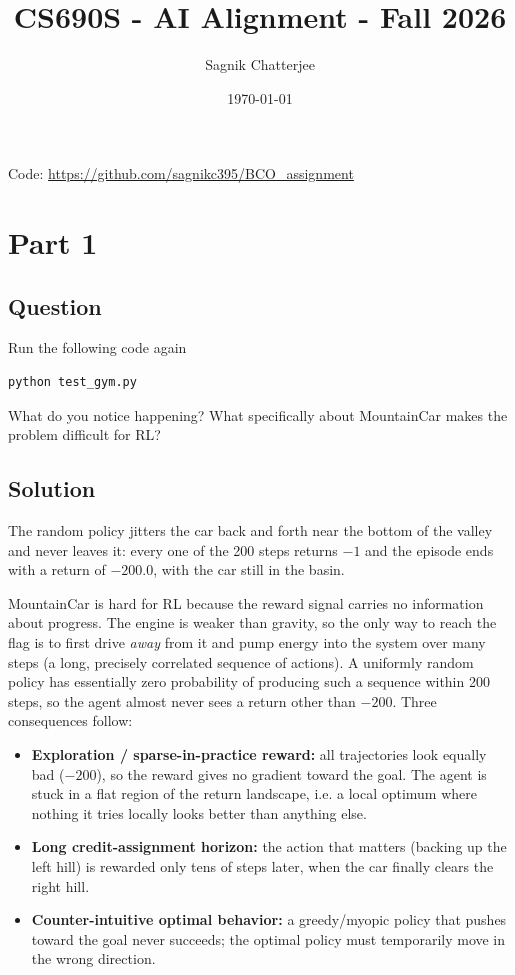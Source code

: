 \documentclass[12pt]{article}%
\begin{document}
\title{CS690S - AI Alignment - Fall 2026}
\author{Sagnik Chatterjee}
\date{\today}
\maketitle

\begin{center}
Code: \url{https://github.com/sagnikc395/BCO_assignment}
\end{center}


\section{Part 1}

\subsection{Question}
Run the following code again
\begin{verbatim}
python test_gym.py
\end{verbatim}
What do you notice happening? What specifically about MountainCar makes the
problem difficult for RL?

\subsection{Solution}
The random policy jitters the car back and forth near the bottom of the valley and never
leaves it: every one of the 200 steps returns $-1$ and the episode ends with a return of
$-200.0$, with the car still in the basin.

MountainCar is hard for RL because the reward signal carries no information about
progress. The engine is weaker than gravity, so the only way to reach the flag is to
first drive \emph{away} from it and pump energy into the system over many steps
(a long, precisely correlated sequence of actions). A uniformly random policy has
essentially zero probability of producing such a sequence within 200 steps, so the
agent almost never sees a return other than $-200$. Three consequences follow:
\begin{itemize}
  \item \textbf{Exploration / sparse-in-practice reward:} all trajectories look equally
        bad ($-200$), so the reward gives no gradient toward the goal. The agent is
        stuck in a flat region of the return landscape, i.e. a local optimum where
        nothing it tries locally looks better than anything else.
  \item \textbf{Long credit-assignment horizon:} the action that matters (backing up the
        left hill) is rewarded only tens of steps later, when the car finally clears the
        right hill.
  \item \textbf{Counter-intuitive optimal behavior:} a greedy/myopic policy that pushes
        toward the goal never succeeds; the optimal policy must temporarily move in the
        wrong direction.
\end{itemize}
\end{document}
